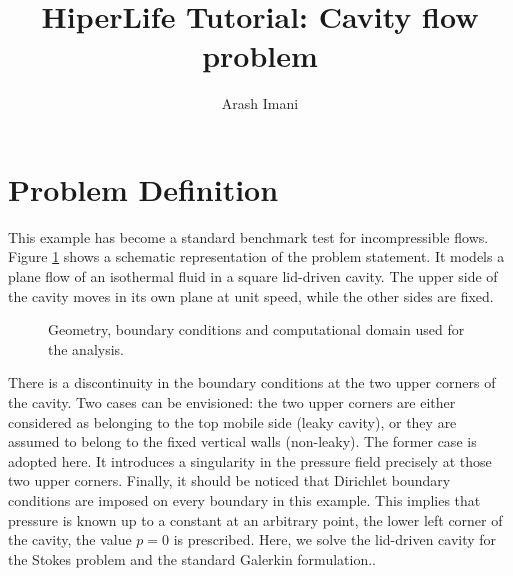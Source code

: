 \documentclass[]{article}
\begin{document}
\title{HiperLife Tutorial: Cavity flow problem}
\author{Arash Imani}
\maketitle

\linenumbers

\section{Problem Definition} \label{sec: pd} 
This example has become a standard benchmark test for incompressible flows. Figure \ref{fig_SB} shows a schematic representation of the problem statement. It models a plane flow of an isothermal fluid in a square lid-driven cavity. The upper side of the cavity moves in its own plane at unit speed, while the other sides are fixed.

\begin{figure}[htbp]
	\centering
	
	\caption{Geometry, boundary conditions and computational domain used for the analysis.}
	\label{fig_SB}
\end{figure}
There is a discontinuity in the boundary conditions at the two upper corners of the cavity. Two cases can be envisioned: the two upper corners are either considered as belonging to the top mobile side (leaky cavity), or they are assumed to belong to the fixed vertical walls (non-leaky). The former case is adopted here. It introduces a singularity in the pressure field precisely at those two upper corners. Finally, it should be noticed that Dirichlet boundary conditions are imposed on every boundary in this example. This implies that pressure is known up to a constant at an arbitrary point, the lower left corner of the cavity, the value $p = 0$ is prescribed. Here, we solve the lid-driven cavity for the Stokes problem and the standard Galerkin formulation.\cite{donea2003finite}.
\end{document}
